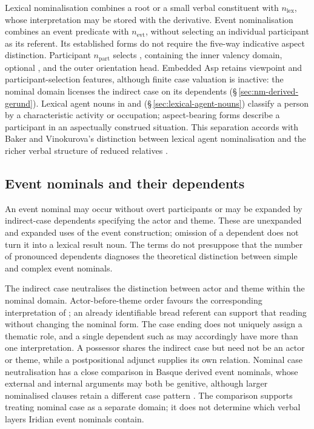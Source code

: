 Lexical nominalisation combines a root or a small verbal constituent with
$n_{\mathrm{lex}}$, whose interpretation may be stored with the derivative.
Event nominalisation combines an event predicate with $n_{\mathrm{evt}}$,
without selecting an individual participant as its referent. Its established
forms do not require the five-way indicative aspect distinction. Participant
$n_{\mathrm{part}}$ selects , containing
the inner valency domain, optional , and the outer
orientation head.
Embedded Asp retains viewpoint and participant-selection features, although
finite case valuation is inactive: the nominal domain licenses the indirect
case on its dependents (§\,\ref{sec:nm-derived-gerund}). Lexical agent nouns
in  and  (§\,\ref{sec:lexical-agent-nouns}) classify a
person by a characteristic activity or occupation; aspect-bearing 
forms describe a participant in an aspectually construed situation. This
separation accords with Baker and Vinokurova's distinction between lexical
agent nominalisation and the richer verbal structure of reduced relatives
\cite{bakervinokurova2009}.

\subsection{Event nominals and their dependents}
\label{sec:nm-derived-event}
\label{sec:nm-derived-gerund}

An event nominal may occur without overt participants or may be expanded by
indirect-case dependents specifying the actor and theme. These are unexpanded
and expanded uses of the event construction; omission of a dependent does not
turn it into a lexical result noun. The terms do not presuppose that the number
of pronounced dependents diagnoses the theoretical distinction between simple
and complex event nominals.

\pex
\a {}  
\a {}  
\a {} 
\a {} 
\xe

The indirect case neutralises the distinction between actor and theme within
the nominal domain. Actor-before-theme order favours the corresponding
interpretation of ; an already identifiable
bread referent can support that reading without changing the nominal form.
The case ending does not uniquely assign a thematic role, and a single
dependent such as  may accordingly have more than one
interpretation. A possessor shares the indirect case but need not be an actor
or theme, while a postpositional adjunct supplies its own relation. Nominal
case neutralisation has a close comparison in Basque derived event nominals,
whose external and internal arguments may both be genitive, although larger
nominalised clauses retain a different case pattern \cite{artiagoitia2023}.
The comparison supports treating nominal case as a separate domain; it does
not determine which verbal layers Iridian event nominals contain.

